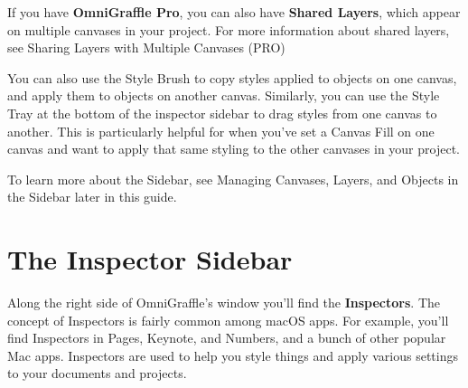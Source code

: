 \documentclass[../main.tex]{subfiles}
\begin{document}
\begin{ognote}
  If you have \textbf{OmniGraffle Pro}, you can also have \textbf{Shared Layers}, which appear
  on multiple
  canvases in your
  project. For more information about shared layers, see Sharing Layers with Multiple Canvases
  (PRO)
\end{ognote}

You can also use the Style Brush to copy styles applied to objects on one canvas, and apply them
to objects
on another canvas. Similarly, you can use the Style Tray at the bottom of the inspector sidebar
to drag
styles from one canvas to another. This is particularly helpful for when you've set a Canvas
Fill on one
canvas and want to apply that same styling to the other canvases in your project.

\begin{ognote}
  To learn more about the Sidebar, see Managing Canvases, Layers, and Objects in the Sidebar
  later in this guide.
\end{ognote}

\section{The Inspector Sidebar}
Along the right side of OmniGraffle's window you'll find the \textbf{Inspectors}. The concept of
Inspectors
is fairly common among macOS apps. For example, you'll find Inspectors in Pages, Keynote, and
Numbers, and a
bunch of other popular Mac apps. Inspectors are used to help you style things and apply various
settings to
your documents and projects.
\end{document}
